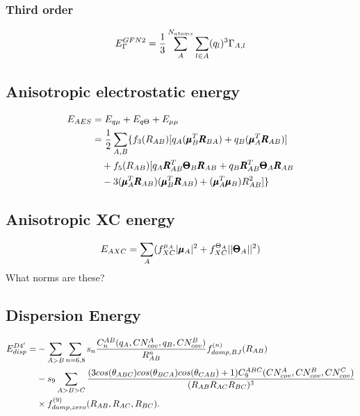 \subsubsection{Third order}
\begin{equation}
    \E{\Gamma}^{GFN2} = \frac{1}{3}\sum_A^{N_{atoms}}\sum_{l\in A}(q_l)^3\Gamma_{A,l}
\end{equation}
\subsection{Anisotropic electrostatic energy}
\begin{equation}
\begin{split}
    \E{AES} &= \E{q\mu}+\E{q\Theta} + \E{\mu\mu}\\
    &= \frac{1}{2}\sum_{A,B}\{f_3(R_{AB})[q_A(\pmb{\mu}_B^T\pmb{R}_{BA})+q_B(\pmb{\mu}_A^T\pmb{R}_{AB})]\\
    &\quad + f_5(R_{AB})[q_A\pmb{R}_{AB}^T\pmb{\Theta}_B\pmb{R}_{AB}+q_B\pmb{R}_{AB}^T\pmb{\Theta}_A\pmb{R}_{AB}\\
    &\quad -3(\pmb{\mu}_A^T\pmb{R}_{AB})(\pmb{\mu}_B^T\pmb{R}_{AB}) + (\pmb{\mu}_A^T\pmb{\mu}_B)R_{AB}^2] \}\\
\end{split}
\end{equation}



\subsection{Anisotropic XC energy}
\begin{equation}
    \E{AXC} = \sum_A (f^{\mu_A}_{XC}|\pmb{\mu}_A|^2 + f^{\Theta_A}_{XC}||\pmb{\Theta}_A||^2)
\end{equation}
What norms are these?

\newpage

\subsection{Dispersion Energy}
\begin{equation}
\begin{split}
  \E{disp}^{D4'} = &-\sum_{A>B} \sum_{n=6,8} s_n \frac{C_n^{AB} (q_A, CN^A_{cov}, q_B, CN^B_{cov})}{R^n_{AB}} f^{(n)}_{damp,BJ} (R_{AB}) \\
  &-s_9 \sum_{A>B>C} \frac{(3cos(\theta_{ABC})cos(\theta_{BCA})cos(\theta_{CAB})+1)C_9^{ABC}(CN_{cov}^A,CN_{cov}^B,CN_{cov}^C)}{(R_{AB} R_{AC} R_{BC})^3} \\
  &\times f^{(9)}_{damp,zero}(R_{AB},R_{AC},R_{BC}).
\end{split}
\end{equation}

